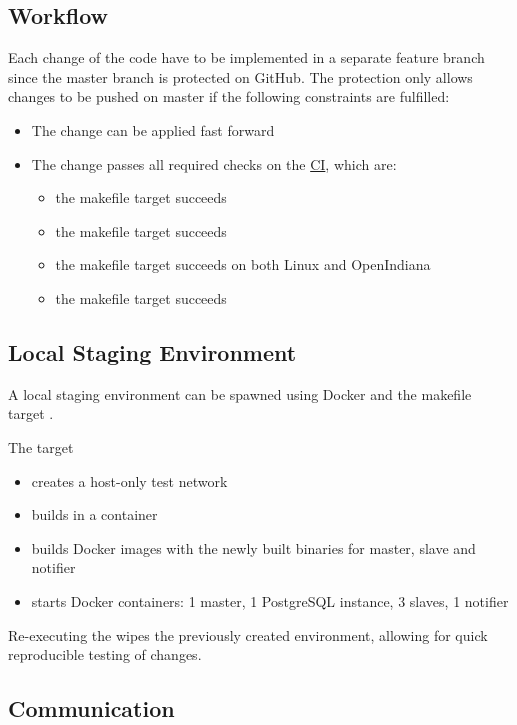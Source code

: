 \subsection{Workflow}
Each change of the code have to be implemented in a separate feature branch since the master branch is protected on GitHub. The protection 
only allows changes to be pushed on master if the following constraints are fulfilled:
\begin{itemize}
	\item The change can be applied fast forward
	\item The change passes all required checks on the \hyperref[ci]{CI}, which are:
	\begin{itemize}
		\item the  makefile target succeeds
		\item the  makefile target succeeds
		\item the  makefile target succeeds on both Linux and OpenIndiana
		\item the  makefile target succeeds
	\end{itemize}
\end{itemize}

\subsection{Local Staging Environment}\label{dev:staging}
A local staging environment can be spawned using Docker and the makefile target .

The target
\begin{itemize}
  \item creates a host-only test network
  \item builds \mamid in a container
  \item builds Docker images with the newly built binaries for master, slave and notifier
  \item starts Docker containers: 1 master, 1 PostgreSQL instance, 3 slaves, 1 notifier
\end{itemize}

Re-executing the  wipes the previously created environment, allowing for quick reproducible testing of changes.

\subsection{Communication}

